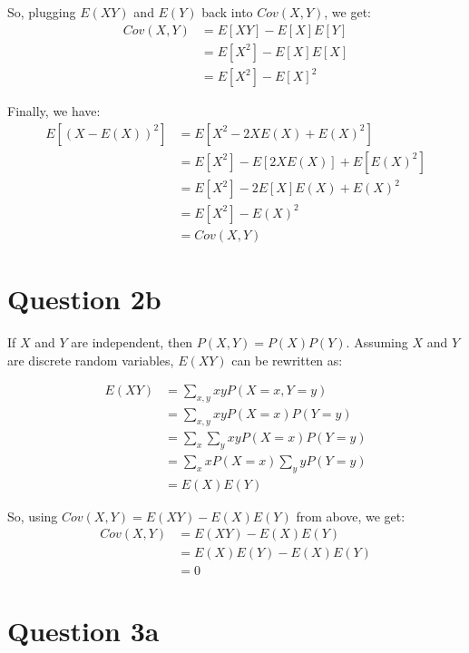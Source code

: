 \documentclass{article}
\begin{document}
    So, plugging $E(XY)$ and $E(Y)$ back into $Cov(X, Y)$, we get:
    \begin{align*}
        Cov(X, Y)   &= E[XY] - E[X]E[Y] \\
                    &= E[X^{2}] - E[X]E[X] \\
                    &= E[X^{2}] - E[X]^{2}
    \end{align*}

    Finally, we have:
    \begin{align*}
        E[(X - E(X))^{2}]   &= E[X^{2} - 2XE(X) + E(X)^{2}] \\
                            &= E[X^{2}] - E[2XE(X)] + E[E(X)^{2}] \\
                            &= E[X^{2}] - 2E[X]E(X) + E(X)^{2} \\
                            &= E[X^{2}] - E(X)^{2} \\
                            &= Cov(X, Y)
    \end{align*}

    \section*{Question 2b}
    If $X$ and $Y$ are independent, then $P(X,Y) = P(X)P(Y)$. Assuming $X$ and $Y$ are discrete random variables, $E(XY)$ can be rewritten as:

    \begin{align*}
        E(XY)   &= \sum_{x,y} xy P(X=x, Y=y) \\
                &= \sum_{x,y} xy P(X=x)P(Y=y) \\
                &= \sum_{x} \sum_{y} xy P(X=x)P(Y=y) \\
                &= \sum_{x} x P(X=x) \sum_{y} y P(Y=y) \\
                &= E(X)E(Y)
    \end{align*}

    So, using $Cov(X, Y) = E(XY) - E(X)E(Y)$ from above, we get:
    \begin{align*}
        Cov(X, Y)   &= E(XY) - E(X)E(Y) \\
                    &= E(X)E(Y) - E(X)E(Y) \\
                    &= 0
    \end{align*}

    \section*{Question 3a}
\end{document}

